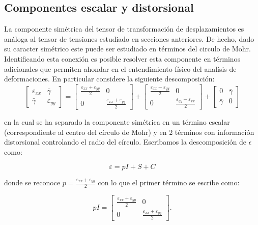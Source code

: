 \documentclass[../notas medios.tex]{subfiles}
\begin{document}
\subsection{Componentes escalar y distorsional}
La componente simétrica del tensor de transformación de desplazamientos es análoga al tensor de tensiones estudiado en secciones anteriores. De hecho, dado su caracter simétrico este puede ser estudiado en términos del circulo de Mohr. Identificando esta conexión es posible resolver esta componente en términos adicionales que permiten ahondar en el entendimiento físico del analísis de deformaciones. En particular considere la siguiente descomposición:
\begin{equation}
\left[ {\begin{array}{*{20}{c}}
{{\varepsilon _{xx}}}&\bar{\gamma} \\
\bar{\gamma} &{{\varepsilon _{yy}}}
\end{array}} \right] = \left[ {\begin{array}{*{20}{c}}
{\frac{{{\varepsilon _{xx}} + {\varepsilon _{yy}}}}{2}}&0\\
0&{\frac{{{\varepsilon _{xx}} + {\varepsilon _{yy}}}}{2}}
\end{array}} \right] + \left[ {\begin{array}{*{20}{c}}
{\frac{{{\varepsilon _{xx}} - {\varepsilon _{yy}}}}{2}}&0\\
0&{\frac{{{\varepsilon _{yy}} - {\varepsilon _{xx}}}}{2}}
\end{array}} \right] + \left[ {\begin{array}{*{20}{c}}
0&\bar{\gamma} \\
\bar{\gamma} &0
\end{array}} \right]
\label{otras}
\end{equation}



en la cual se ha separado la componente simétrica en un término escalar (correspondiente al centro del círculo de Mohr) y en 2 términos con información distorsional controlando el radio del círculo. Escribamos la descomposición de $\epsilon$ como:

\[\varepsilon  = pI + S + C\]

donde se reconoce $p={\frac{{{\varepsilon _{xx}} + {\varepsilon _{yy}}}}{2}}$ con lo que el primer término se escribe como:


\[pI = \left[ {\begin{array}{*{20}{c}}
{\frac{{{\varepsilon _{xx}} + {\varepsilon _{yy}}}}{2}}&0\\
0&{\frac{{{\varepsilon _{xx}} + {\varepsilon _{yy}}}}{2}}
\end{array}} \right].\]
\end{document}
